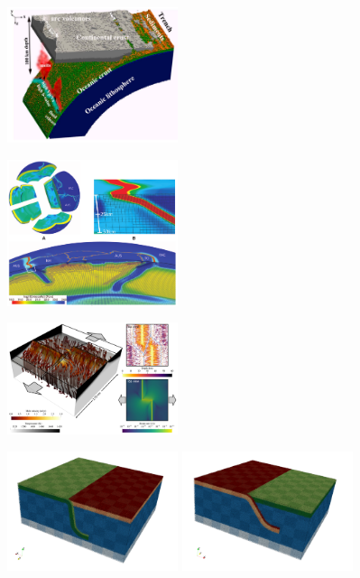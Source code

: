 

\includegraphics[width=5cm]{images/beautiful/zhgt13}\cite{zhgt13}

\includegraphics[width=5cm]{images/beautiful/stgb10}\cite{stgb10}

\includegraphics[width=5cm]{images/beautiful/dagg19}\cite{dagg19}

\includegraphics[width=5cm]{images/beautiful/frtv19a}
\includegraphics[width=5cm]{images/beautiful/frtv19b}\cite{frtv19}
